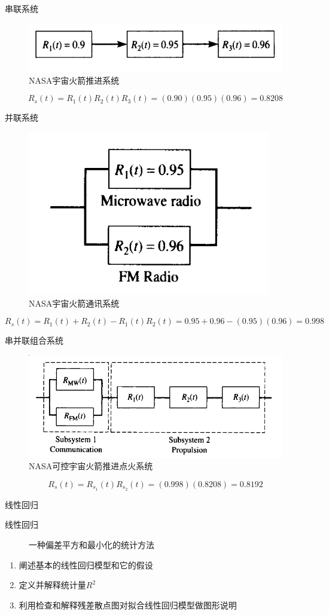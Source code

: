 \documentclass[UTF8]{ctexbeamer}
\begin{document}
\begin{frame}{串联系统}
  \begin{figure}
    \centering
    \includegraphics[width=.5\textwidth{}]{nasa.png}
    \caption{NASA宇宙火箭推进系统}
  \end{figure}

  \[
  R_s(t) = R_1(t)R_2(t)R_3(t) = (0.90)(0.95)(0.96) = 0.8208
  \]
  
\end{frame}

\begin{frame}{并联系统}
  \begin{figure}
    \centering
    \includegraphics[width=.4\textwidth{}]{nasa-comm.png}
    \caption{NASA宇宙火箭通讯系统}
  \end{figure}

  \[
  R_s(t) = R_1(t) + R_2(t) - R_1(t)R_2(t) = 0.95 + 0.96 - (0.95)(0.96) = 0.998
  \]
  
\end{frame}

\begin{frame}{串并联组合系统}
  \begin{figure}
    \centering
    \includegraphics[width=.5\textwidth{}]{nasa-total.png}
    \caption{NASA可控宇宙火箭推进点火系统}
  \end{figure}

  \[
  R_s(t) = R_{s_1}(t)R_{s_2}(t) = (0.998)(0.8208) = 0.8192
  \]
  
\end{frame}

\begin{frame}{线性回归}
  \begin{description}
  \item[线性回归] 一种偏差平方和最小化的统计方法
  \end{description}
  
  \begin{enumerate}
  \item 阐述基本的线性回归模型和它的假设
  \item 定义并解释统计量$R^2$
  \item 利用检查和解释残差散点图对拟合线性回归模型做图形说明
  \end{enumerate}
  
\end{frame}
\end{document}
